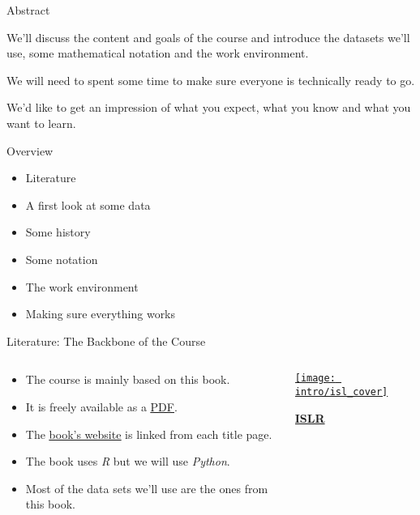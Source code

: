 \documentclass[mathserif, aspectratio=169]{beamer}
\subtitle{\bfseries%
  {Introduction\\\it Course Overview \& Work Environment}\\%
  {\tiny\it course content \& goals, datasets, mathematical notation, technicalities, getting ready}\\%
}
\begin{document}


\begin{frame}{Abstract}

	\begin{blurb}
			We'll discuss the content and goals of the course and introduce 
			the datasets we'll use, some mathematical notation and 
			the work environment.

			We will need to spent some time to make sure everyone is
			technically ready to go. 

			We'd like to get an impression of what you expect, what you know
			and what you want to learn.  
	\end{blurb}
\end{frame}

\begin{frame}{Overview}
	\begin{itemize}
		\item Literature
		\item A first look at some data
		\item Some history
		\item Some notation
		\item The work environment
		\item Making sure everything works
	\end{itemize}
\end{frame}

\begin{frame}{Literature: The Backbone of the Course}
	\begin{columns}
		\begin{column}{0.6\textwidth}
			\begin{itemize}
				\item The course is mainly based on this book.
				\item It is freely available as a
					\href{http://faculty.marshall.usc.edu/gareth-james/ISL/ISLR\%20Seventh\%20Printing.pdf}{\blue\underline{PDF}}.
				\item The \href{www.statlearning.com}{\blue\underline{book's website}} is linked from each title page.
				\item The book uses \emph{R} but we will use \emph{Python}. 
				\item Most of the data sets we'll use are the ones from this book.
			\end{itemize}
		\end{column}
		\begin{column}{0.4\textwidth}
			\begin{center}
				\href{www.statlearning.com}{\texttt{[image: intro/isl\_cover]}}
			\end{center}
			\begin{center}
				\href{www.statlearning.com}{\bfseries\blue ISLR}
			\end{center}
		\end{column}
	\end{columns}
\end{frame}
\end{document}
